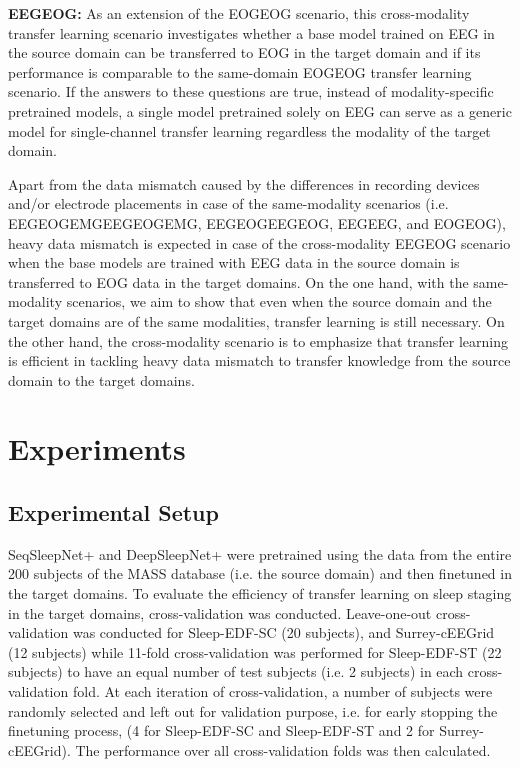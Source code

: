 \documentclass[journal,twoside,web]{ieeecolor}
\begin{document}
{\bf EEGEOG:} As an extension of the EOGEOG scenario, this cross-modality transfer learning scenario investigates whether a base model trained on EEG in the source domain can be transferred to EOG in the target domain and if its performance is comparable to the same-domain EOGEOG transfer learning scenario. If the answers to these questions are true, instead of modality-specific pretrained models, a single model pretrained solely on EEG can serve as a generic model for single-channel transfer learning regardless the modality of the target domain.

Apart from the data mismatch caused by the differences in recording devices and/or electrode placements in case of the same-modality scenarios (i.e. EEGEOGEMGEEGEOGEMG, EEGEOGEEGEOG, EEGEEG, and EOGEOG), heavy data mismatch is expected in case of the cross-modality EEGEOG scenario when the base models are trained with EEG data in the source domain is transferred to EOG data in the target domains. On the one hand, with the same-modality scenarios, we aim to show that even when the source domain and the target domains are of the same modalities, transfer learning is still necessary. On the other hand, the cross-modality scenario is to emphasize that transfer learning is efficient in tackling heavy data mismatch to transfer knowledge from the source domain to the target domains.

\vspace{-0.2cm}
\section{Experiments}
\subsection{Experimental Setup}
SeqSleepNet+ and DeepSleepNet+ were pretrained using the data from the entire 200 subjects of the MASS database (i.e. the source domain) and then finetuned in the target domains. To evaluate the efficiency of transfer learning on sleep staging in the target domains, cross-validation was conducted. Leave-one-out cross-validation was conducted for Sleep-EDF-SC (20 subjects), and Surrey-cEEGrid (12 subjects) while 11-fold cross-validation was performed for Sleep-EDF-ST (22 subjects) to have an equal number of test subjects (i.e. 2 subjects) in each cross-validation fold. At each iteration of cross-validation, a number of subjects were randomly selected and left out for validation purpose, i.e. for early stopping the finetuning process, (4 for Sleep-EDF-SC and Sleep-EDF-ST and 2 for Surrey-cEEGrid). The performance over all cross-validation folds was then calculated. 
\end{document}
